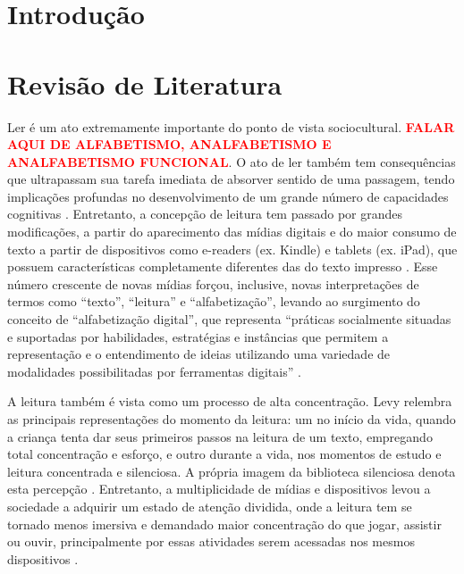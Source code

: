 \documentclass[
	article,			%
	11pt,				%
	oneside,			%
	a4paper,			%
	english,			%
	brazil,				%
	sumario=tradicional
	]{abntex2}
\begin{document}
\section{Introdução}

\lipsum[55-57]
\section{Revisão de Literatura}

Ler é um ato extremamente importante do ponto de vista sociocultural. \textcolor{red}{\textbf{FALAR AQUI DE ALFABETISMO, ANALFABETISMO E ANALFABETISMO FUNCIONAL}}. O ato de ler também tem consequências que ultrapassam sua tarefa imediata de absorver sentido de uma passagem, tendo implicações profundas no desenvolvimento de um grande número de capacidades cognitivas \cite{Cunningham2001}.
Entretanto, a concepção de leitura tem passado por grandes modificações, a partir do aparecimento das mídias digitais e do maior consumo de texto a partir de dispositivos como e-readers (ex. Kindle) e tablets (ex. iPad), que possuem características completamente diferentes das do texto impresso \cite{Mangen2016}. Esse número crescente de novas mídias forçou, inclusive, novas interpretações de termos como “texto”, “leitura” e “alfabetização”, levando ao surgimento do conceito de “alfabetização digital”, que representa “práticas socialmente situadas e suportadas por habilidades, estratégias e instâncias que permitem a representação e o entendimento de ideias utilizando uma variedade de modalidades possibilitadas por ferramentas digitais” \cite{OBrien2008}.

A leitura também é vista como um processo de alta concentração. Levy relembra as principais representações do momento da leitura: um no início da vida, quando a criança tenta dar seus primeiros passos na leitura de um texto, empregando total concentração e esforço, e outro durante a vida, nos momentos de estudo e leitura concentrada e silenciosa. A própria imagem da biblioteca silenciosa denota esta percepção \cite{Levy1997}. Entretanto, a multiplicidade de mídias e dispositivos levou a sociedade a adquirir um estado de atenção dividida, onde a leitura tem se tornado menos imersiva e demandado maior concentração do que jogar, assistir ou ouvir, principalmente por essas atividades serem acessadas nos mesmos dispositivos \cite{Mangen2016}.
\end{document}
